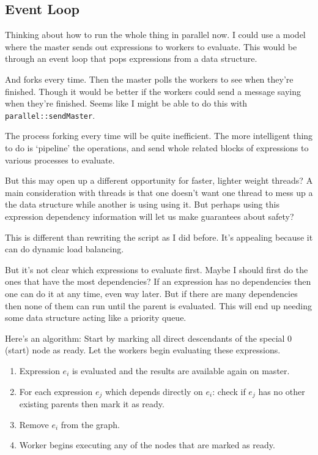 \documentclass[12pt]{article}
\begin{document}
\subsection{Event Loop}

Thinking about how to run the whole thing in parallel now. I could use a
model where the master sends out expressions to workers to
evaluate. This would be through an event loop that pops expressions from a data
structure.

And forks every time. Then the master polls the workers to see
when they're finished. Though it would be better if the workers could send a
message saying when they're finished. Seems like I might be able to do this
with \texttt{parallel::sendMaster}.

The process forking every time will be quite inefficient. The more intelligent
thing to do is `pipeline' the operations, and send whole related blocks of
expressions to various processes to evaluate.

But this may open up a different opportunity for faster, lighter weight
threads? A main consideration with threads is that one doesn't want one
thread to mess up a the data structure while another is using using it. But
perhaps using this expression dependency information will let us make
guarantees about safety?


This is different than rewriting the script as I did before. It's appealing
because it can do dynamic load balancing.

But it's not clear which expressions to evaluate first. Maybe I should
first do the ones that have the most dependencies? If an expression has no
dependencies then one can do it at any time, even way later. But if there
are many dependencies then none of them can run until the parent is
evaluated. This will end up needing some data structure acting like a priority queue.

Here's an algorithm: Start by marking all direct descendants of the special
0 (start) node as ready. Let the workers begin evaluating these
expressions.

\begin{enumerate}
    \item Expression $e_i$ is evaluated and the results are available again
        on master.
    \item For each expression $e_j$ which depends directly on $e_i$: check
        if $e_j$ has no other existing parents then mark it as ready.
    \item Remove $e_i$ from the graph.
    \item Worker begins executing any of the nodes that are marked as ready.
\end{enumerate}
\end{document}

